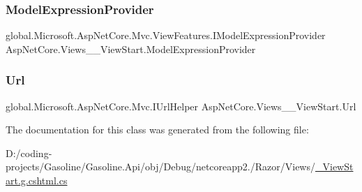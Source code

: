 \mbox{\label{class_asp_net_core_1_1_views_____view_start_a97902ea5e8251ff63e9a2f4dd5389943}} 
\subsubsection{\texorpdfstring{ModelExpressionProvider}{ModelExpressionProvider}}
{\footnotesize\ttfamily global.\+Microsoft.\+Asp\+Net\+Core.\+Mvc.\+View\+Features.\+I\+Model\+Expression\+Provider Asp\+Net\+Core.\+Views\+\_\+\+\_\+\+View\+Start.\+Model\+Expression\+Provider\hspace{0.3cm}{\ttfamily [get]}}

\mbox{\label{class_asp_net_core_1_1_views_____view_start_aac82cabef8b298088c0b7a539476bd8b}} 
\subsubsection{\texorpdfstring{Url}{Url}}
{\footnotesize\ttfamily global.\+Microsoft.\+Asp\+Net\+Core.\+Mvc.\+I\+Url\+Helper Asp\+Net\+Core.\+Views\+\_\+\+\_\+\+View\+Start.\+Url\hspace{0.3cm}{\ttfamily [get]}}



The documentation for this class was generated from the following file\+:\begin{DoxyCompactItemize}
\item 
D\+:/coding-\/projects/\+Gasoline/\+Gasoline.\+Api/obj/\+Debug/netcoreapp2./\+Razor/\+Views/\mbox{\hyperlink{___view_start_8g_8cshtml_8cs}{\+\_\+\+View\+Start.\+g.\+cshtml.\+cs}}\end{DoxyCompactItemize}
